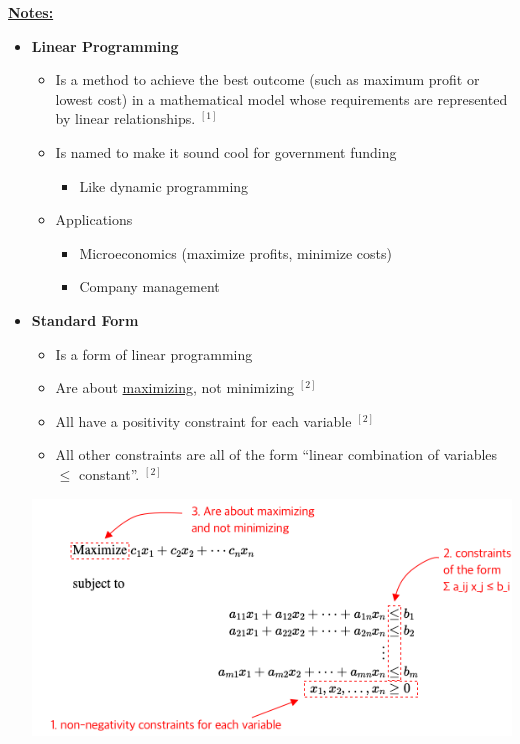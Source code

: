 \documentclass[12pt]{article}
\begin{document}
\begin{enumerate}[1.]
    \underline{\textbf{Notes:}}

    \bigskip

    \begin{itemize}
        \item \textbf{Linear Programming}
        \begin{itemize}
            \item Is a method to achieve the best outcome (such as maximum profit or lowest cost) in a mathematical model
            whose requirements are represented by linear relationships. $^{[1]}$
            \item Is named to make it sound cool for government funding
            \begin{itemize}
                \item Like dynamic programming
            \end{itemize}
            \item Applications

            \begin{itemize}
                \item Microeconomics (maximize profits, minimize costs)
                \item Company management
            \end{itemize}
        \end{itemize}

        \item \textbf{Standard Form}

        \begin{itemize}
            \item Is a form of linear programming
            \item Are about \ul{maximizing}, not minimizing $^{[2]}$
            \item All have a positivity constraint for each variable $^{[2]}$
            \item All other constraints are all of the form “linear combination of variables $\leq$ constant”. $^{[2]}$
        \end{itemize}

        \bigskip

        \begin{center}
        \includegraphics[width=0.8\linewidth]{images/worksheet_6_solution_1.png}
        \end{center}


\end{itemize}
\end{enumerate}
\end{document}
